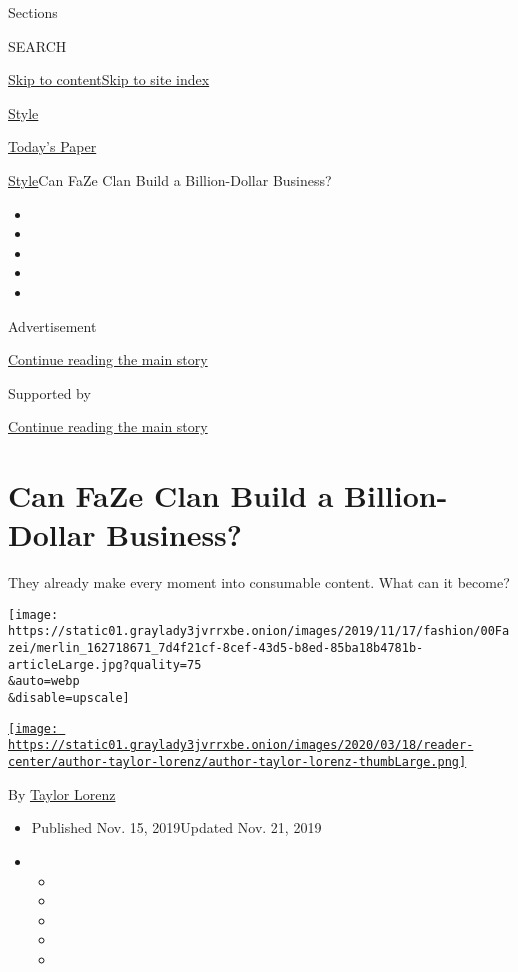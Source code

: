 Sections

SEARCH

\protect\hyperlink{site-content}{Skip to
content}\protect\hyperlink{site-index}{Skip to site index}

\href{https://www.nytimes3xbfgragh.onion/section/style}{Style}

\href{https://myaccount.nytimes3xbfgragh.onion/auth/login?response_type=cookie\&client_id=vi}{}

\href{https://www.nytimes3xbfgragh.onion/section/todayspaper}{Today's
Paper}

\href{/section/style}{Style}\textbar{}Can FaZe Clan Build a
Billion-Dollar Business?

\begin{itemize}
\item
\item
\item
\item
\item
\end{itemize}

Advertisement

\protect\hyperlink{after-top}{Continue reading the main story}

Supported by

\protect\hyperlink{after-sponsor}{Continue reading the main story}

\hypertarget{can-faze-clan-build-a-billion-dollar-business}{%
\section{Can FaZe Clan Build a Billion-Dollar
Business?}\label{can-faze-clan-build-a-billion-dollar-business}}

They already make every moment into consumable content. What can it
become?

\texttt{[image: https://static01.graylady3jvrrxbe.onion/images/2019/11/17/fashion/00Fazei/merlin\_162718671\_7d4f21cf-8cef-43d5-b8ed-85ba18b4781b-articleLarge.jpg?quality=75\\\&auto=webp\\\&disable=upscale]}

\href{https://www.nytimes3xbfgragh.onion/by/taylor-lorenz}{\texttt{[image: https://static01.graylady3jvrrxbe.onion/images/2020/03/18/reader-center/author-taylor-lorenz/author-taylor-lorenz-thumbLarge.png]}}

By \href{https://www.nytimes3xbfgragh.onion/by/taylor-lorenz}{Taylor
Lorenz}

\begin{itemize}
\item
  Published Nov. 15, 2019Updated Nov. 21, 2019
\item
  \begin{itemize}
  \item
  \item
  \item
  \item
  \item
  \end{itemize}
\end{itemize}


